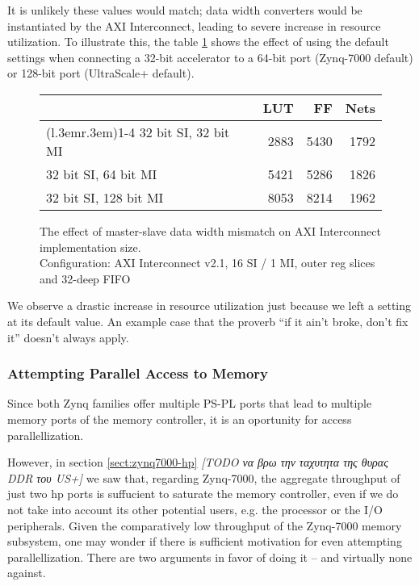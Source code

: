 It is unlikely these values would match; data width converters would be instantiated by
the AXI Interconnect, leading to severe increase in resource utilization.
To illustrate this, the table \ref{tab:int-dw} shows the effect of using the default
settings when connecting a 32-bit accelerator to a 64-bit port (Zynq-7000 default)
or 128-bit port (UltraScale+ default).

\begin{figure}[ht!]
\centering
\begin{tabular}{lrrr}
\toprule
			& LUT	& FF	& Nets \\
\cmidrule(l{.3em}r{.3em}){1-4}
32 bit SI, 32 bit MI	& 2883 & 5430 & 1792 \\
32 bit SI, 64 bit MI	& 5421	&5286	&1826	\\
32 bit SI, 128 bit MI	& 8053	&8214	&1962	\\
\bottomrule
\end{tabular}
\caption{The effect of master-slave data width mismatch on AXI Interconnect implementation size.\\
	Configuration: AXI Interconnect v2.1, 16 SI / 1 MI, outer reg slices and 32-deep FIFO}
\label{tab:int-dw}
\end{figure}

We observe a drastic increase in resource utilization just because
we left a setting at its default value. 
An example case that the proverb ``if it ain't broke, don't fix it'' doesn't always apply.

\subsubsection{Attempting Parallel Access to Memory}

Since both Zynq families offer multiple PS-PL ports that lead to 
multiple memory ports of the memory controller,
it is an oportunity for access parallellization.

However, in section \ref{sect:zynq7000-hp} 
\emph{[TODO να βρω την ταχυτητα της θυρας DDR του US+]} 
we saw that, regarding Zynq-7000,
the aggregate throughput of just two \gls{hp} ports
is suffucient to saturate the memory controller, 
even if we do not take into account its other potential users, 
e.g. the processor or the I/O peripherals.
Given the comparatively low throughput of the Zynq-7000 memory subsystem,
one may wonder if there is sufficient motivation for even attempting parallellization.
There are two arguments in favor of doing it -- and virtually none against.

